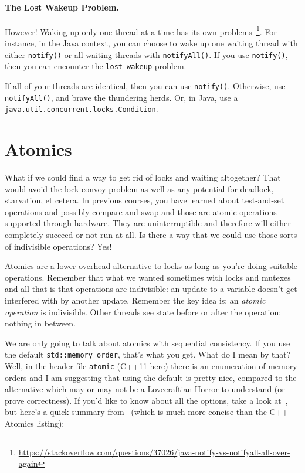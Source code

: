 \documentclass[a4paper]{report}
\begin{document}
\paragraph{The Lost Wakeup Problem.} However! Waking up only one thread at a time has its own problems~\footnote{\url{https://stackoverflow.com/questions/37026/java-notify-vs-notifyall-all-over-again}}. For instance, in the Java context, you can choose to wake up one waiting thread with either \texttt{notify()} or all waiting threads with \texttt{notifyAll()}. If you use \texttt{notify()}, then you can encounter the \texttt{lost wakeup} problem.

If all of your threads are identical, then you can use \texttt{notify()}. Otherwise, use \texttt{notifyAll()}, and brave the thundering herds. Or, in Java, use a \texttt{java.util.concurrent.locks.Condition}.

\section*{Atomics}
What if we could find a way to get rid of locks and waiting altogether? That would avoid the lock convoy problem as well as any potential for deadlock, starvation, et cetera. In previous courses, you have learned about test-and-set operations and possibly compare-and-swap and those are atomic operations supported through hardware. They are uninterruptible and therefore will either completely succeed or not run at all. Is there a way that we could use those sorts of indivisible operations? Yes!

Atomics are a lower-overhead alternative to
locks as long as you're doing suitable operations. Remember that what we wanted sometimes with locks and mutexes and all that is that operations are indivisible: an update to a variable doesn't get interfered with by another update. Remember the key idea is: an \textit{atomic operation} is indivisible. Other threads see state before or after the operation; nothing in between.


We are only going to talk about atomics with sequential consistency. If you use the default {\tt std::memory\_order}, that's what you get. What do I mean by that? Well, in the header file \texttt{atomic} (C++11 here) there is an enumeration of memory orders and I am suggesting that using the default is pretty nice, compared to the alternative which may or may not be a Lovecraftian Horror to understand (or prove correctness). If you'd like to know about all the options, take a look at~\cite{cppatomics}, but here's a quick summary from~\cite{bmref1} (which is much more concise than the C++ Atomics listing):
\end{document}
